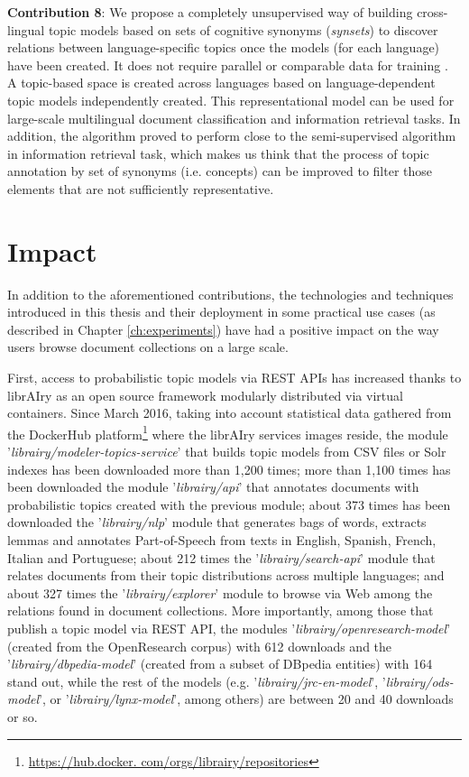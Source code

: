 \textbf{Contribution 8}: We propose a completely unsupervised way of building cross-lingual topic models based on sets of cognitive synonyms (\textit{synsets}) \citep{Miller1995WordNet:English} to discover relations between language-specific topics once the models (for each language) have been created. It does not require parallel or comparable data for training \citep{Badenes-Olmedo2019, Badenes-Olmedo2019b}. A topic-based space is created across languages based on language-dependent topic models independently created. This representational model can be used for large-scale multilingual document classification and information retrieval tasks. In addition, the algorithm proved to perform close to the semi-supervised algorithm in information retrieval task, which makes us think that the process of topic annotation by set of synonyms (i.e. concepts) can be improved to filter those elements that are not sufficiently representative.


\section{Impact}

In addition to the aforementioned contributions, the technologies and techniques introduced in this thesis and their deployment in some practical use cases (as described in Chapter \ref{ch:experiments}) have had a positive impact on the way users browse document collections on a large scale.

First, access to probabilistic topic models via REST APIs has increased thanks to librAIry as an open source framework modularly distributed via virtual containers. Since March 2016, taking into account statistical data gathered from the DockerHub platform\footnote{\url{https://hub.docker. com/orgs/librairy/repositories}} where the librAIry services images reside, the module '\textit{librairy/modeler-topics-service}' that builds topic models from CSV files or Solr indexes has been downloaded more than 1,200 times; more than 1,100 times has been downloaded the module '\textit{librairy/api}' that annotates documents with probabilistic topics created with the previous module; about 373 times has been downloaded the '\textit{librairy/nlp}' module that generates bags of words, extracts lemmas and annotates Part-of-Speech from texts in English, Spanish, French, Italian and Portuguese; about 212 times the '\textit{librairy/search-api}' module that relates documents from their topic distributions across multiple languages; and about 327 times the '\textit{librairy/explorer}' module to browse via Web among the relations found in document collections. More importantly, among those that publish a topic model via REST API, the modules '\textit{librairy/openresearch-model}' (created from the OpenResearch corpus) with 612 downloads and the '\textit{librairy/dbpedia-model}' (created from a subset of DBpedia entities) with 164 stand out, while the rest of the models (e.g. '\textit{librairy/jrc-en-model}', '\textit{librairy/ods-model}',  or '\textit{librairy/lynx-model}', among others) are between 20 and 40 downloads or so. 

